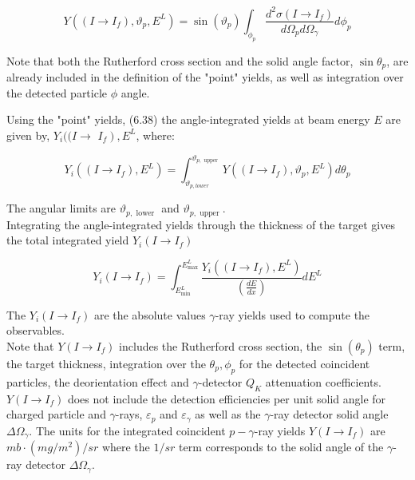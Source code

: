 \documentclass[10pt]{article}
\begin{document}
\begin{equation*}
Y\left(\left(I \rightarrow I_{f}\right), \vartheta_{p}, E^{L}\right)=\sin \left(\vartheta_{p}\right) \int_{\phi_{p}} \frac{d^{2} \sigma\left(I \rightarrow I_{f}\right)}{d \Omega_{p} d \Omega_{\gamma}} d \phi_{p} \tag{6.38}
\end{equation*}


Note that both the Rutherford cross section and the solid angle factor, $\sin \theta_{p}$, are already included in the definition of the "point" yields, as well as integration over the detected particle $\phi$ angle.

Using the "point" yields, (6.38) the angle-integrated yields at beam energy $E$ are given by, $Y_{i}((I \rightarrow$ $\left.I_{f}\right), E^{L}$, where:


\begin{equation*}
Y_{i}\left(\left(I \rightarrow I_{f}\right), E^{L}\right)=\int_{\vartheta_{p, l o w e r}}^{\vartheta_{p, \text { upper }}} Y\left(\left(I \rightarrow I_{f}\right), \vartheta_{p}, E^{L}\right) d \theta_{p} \tag{6.44a}
\end{equation*}


The angular limits are $\vartheta_{p, \text { lower }}$ and $\vartheta_{p, \text { upper }}$.\\
Integrating the angle-integrated yields through the thickness of the target gives the total integrated yield $Y_{i}\left(I \rightarrow I_{f}\right)$


\begin{equation*}
Y_{i}\left(I \rightarrow I_{f}\right)=\int_{E_{\min }^{L}}^{E_{\max }^{L}} \frac{Y_{i}\left(\left(I \rightarrow I_{f}\right), E^{L}\right)}{\left(\frac{d E}{d x}\right)} d E^{L} \tag{6.44b}
\end{equation*}


The $Y_{i}\left(I \rightarrow I_{f}\right)$ are the absolute values $\gamma$-ray yields used to compute the observables.\\
Note that $Y\left(I \rightarrow I_{f}\right)$ includes the Rutherford cross section, the $\sin \left(\theta_{p}\right)$ term, the target thickness, integration over the $\theta_{p}, \phi_{p}$ for the detected coincident particles, the deorientation effect and $\gamma$-detector $Q_{K}$ attenuation coefficients. $Y\left(I \rightarrow I_{f}\right)$ does not include the detection efficiencies per unit solid angle for charged particle and $\gamma$-rays, $\varepsilon_{p}$ and $\varepsilon_{\gamma}$ as well as the $\gamma$-ray detector solid angle $\Delta \Omega_{\gamma}$. The units for the integrated coincident $p-\gamma$-ray yields $Y\left(I \rightarrow I_{f}\right)$ are $m b \cdot\left(m g / m^{2}\right) / s r$ where the $1 / s r$ term corresponds to the solid angle of the $\gamma$-ray detector $\Delta \Omega_{\gamma}$.
\end{document}
